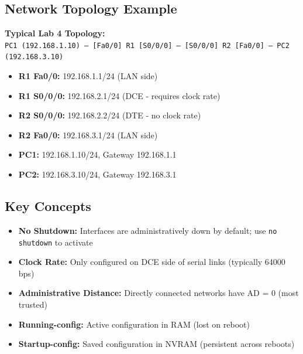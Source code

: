 \documentclass[12pt,a4paper]{article}
\begin{document}
\subsection{Network Topology Example}

\begin{center}
\begin{tcolorbox}[colback=light,colframe=primary,width=0.9\textwidth]
\textbf{Typical Lab 4 Topology:}\\[0.2cm]
\texttt{PC1 (192.168.1.10) --- [Fa0/0] R1 [S0/0/0] --- [S0/0/0] R2 [Fa0/0] --- PC2 (192.168.3.10)}\\[0.3cm]
\begin{itemize}[noitemsep]
    \item \textbf{R1 Fa0/0:} 192.168.1.1/24 (LAN side)
    \item \textbf{R1 S0/0/0:} 192.168.2.1/24 (DCE - requires clock rate)
    \item \textbf{R2 S0/0/0:} 192.168.2.2/24 (DTE - no clock rate)
    \item \textbf{R2 Fa0/0:} 192.168.3.1/24 (LAN side)
    \item \textbf{PC1:} 192.168.1.10/24, Gateway 192.168.1.1
    \item \textbf{PC2:} 192.168.3.10/24, Gateway 192.168.3.1
\end{itemize}
\end{tcolorbox}
\end{center}

\subsection{Key Concepts}

\begin{itemize}
    \item \textbf{No Shutdown:} Interfaces are administratively down by default; use \texttt{no shutdown} to activate
    \item \textbf{Clock Rate:} Only configured on DCE side of serial links (typically 64000 bps)
    \item \textbf{Administrative Distance:} Directly connected networks have AD = 0 (most trusted)
    \item \textbf{Running-config:} Active configuration in RAM (lost on reboot)
    \item \textbf{Startup-config:} Saved configuration in NVRAM (persistent across reboots)
\end{itemize}
\end{document}
